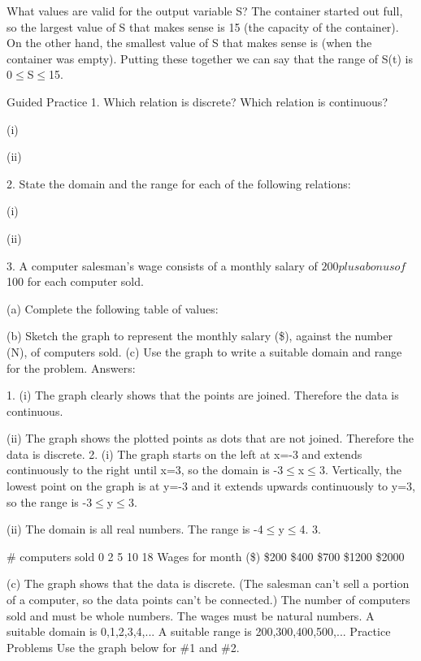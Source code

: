 \documentclass{ximera}
\begin{document}
What values are valid for the output variable S? The container started out full, so the largest value of S that makes sense is 15 (the capacity of the container). On the other hand, the smallest value of S that makes sense is  (when the container was empty). Putting these together we can say that the range of S(t) is 0$\le$S$\le$15.

Guided Practice
1. Which relation is discrete? Which relation is continuous?

(i)  


 
(ii)  


 
2. State the domain and the range for each of the following relations:

(i)  


 
(ii)  


 
3. A computer salesman’s wage consists of a monthly salary of $200 plus a bonus of $100 for each computer sold.

(a) Complete the following table of values:

(b) Sketch the graph to represent the monthly salary (\$), against the number (N), of computers sold.
(c) Use the graph to write a suitable domain and range for the problem.
Answers:

1. (i) The graph clearly shows that the points are joined. Therefore the data is continuous.

(ii) The graph shows the plotted points as dots that are not joined. Therefore the data is discrete.
2. (i) The graph starts on the left at x=-3 and extends continuously to the right until x=3, so the domain is -3$\le$x$\le$3. Vertically, the lowest point on the graph is at y=-3 and it extends upwards continuously to y=3, so the range is -3$\le$y$\le$3.

(ii) The domain is all real numbers. The range is -4$\le$y$\le$4.
3.

\# computers sold	0	2	5	10	18
Wages for month (\$)	\$200	\$400	\$700	\$1200	\$2000
 

(c) The graph shows that the data is discrete. (The salesman can't sell a portion of a computer, so the data points can't be connected.) The number of computers sold and must be whole numbers. The wages must be natural numbers.
A suitable domain is {0,1,2,3,4,...}
A suitable range is {200,300,400,500,...}
Practice Problems
Use the graph below for \#1 and \#2.
\end{document}
